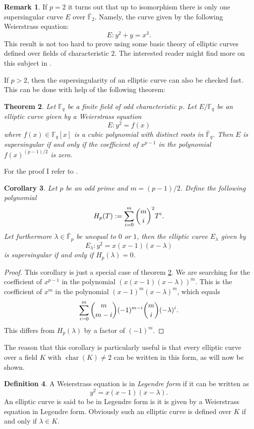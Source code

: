 \documentclass{article}
\numberwithin{equation}{section}
\newtheorem{theorem}{Theorem}[subsection]
\newtheorem{corollary}[theorem]{Corollary}
\theoremstyle{definition}
\newtheorem{definition}[theorem]{Definition}
\newtheorem{remark}[theorem]{Remark}
\newcommand{\FF}[1]{{\mathbb F}_{#1}} %
\newcommand{\FFCL}[1]{{\bar {\mathbb F}}_{#1}} %
\newcommand{\Char}[1]{\operatorname{char} (#1)} %
\begin{document}
\begin{remark}
If $p=2$ it turns out that up to isomorphism there is only one supersingular curve $E$ over $\FFCL{2}$. Namely, the curve given by the following Weierstrass equation: $$E:y^2+y=x^3.$$ This result is not too hard to prove using some basic theory of elliptic curves defined over fields of characteristic $2$. The interested reader might find more on this subject in \cite[1.7]{ECHandbook}.
\end{remark}

If $p > 2$, then the supersingularity of an elliptic curve can also be checked fast. This can be done with help of the following theorem:

\begin{theorem}\label{calcHasse}
Let $\FF{q}$ be a finite field of odd characteristic $p$.
Let $E/\FF{q}$ be an elliptic curve given by a Weierstrass equation $$E:y^2=f(x)$$ where $f(x)\in \FF{q}[x]$ is a cubic polynomial with distinct roots in $\FFCL{q}$. Then $E$ is supersingular if and only if the coefficient of $x^{p-1}$ in the polynomial $f(x)^{(p-1)/2}$ is zero.
\end{theorem}

For the proof I refer to \cite[V.4.1]{Silverman}. 

\begin{corollary}\label{calcHasseLeg}
Let $p$ be an odd prime and $m=(p-1)/2$. Define the following polynomial $$H_p(T):=\sum_{i=0}^m \dbinom{m}{i}^2 T^i.$$ Let furthermore $\lambda \in \FFCL{p}$ be unequal to $0$ or $1$, then the elliptic curve $E_\lambda$ given by $$E_\lambda:y^2=x(x-1)(x-\lambda)$$ is supersingular if and only if $H_p(\lambda)=0$.
\end{corollary}

\begin{proof}
This corollary is just a special case of theorem \ref{calcHasse}. We are searching for the coefficient of $x^{p-1}$ in the polynomial $(x(x-1)(x-\lambda))^m$. This is the coefficient of $x^m$ in the polynomial $(x-1)^m(x-\lambda)^m$, which equals $$\sum_{i=0}^m \dbinom{m}{m-i}(-1)^{m-i} \dbinom{m}{i} (-\lambda)^i.$$ This differs from $H_p(\lambda)$ by a factor of $(-1)^m$.
\end{proof}

The reason that this corollary is particularly useful is that every elliptic curve over a field $K$ with $\Char{K} \neq 2$ can be written in this form, as will now be shown.

\begin{definition}
A Weierstrass equation is in \emph{Legendre form} if it can be written as $$y^2=x(x-1)(x-\lambda).$$ An elliptic curve is said to be in Legendre form is it is given by a Weierstrass equation in Legendre form. Obviously such an elliptic curve is defined over $K$ if and only if $\lambda \in K$. 
\end{definition}
\end{document}

